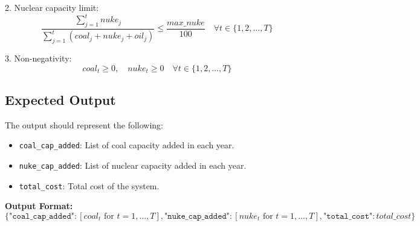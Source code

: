 \documentclass{article}
\begin{document}
2. Nuclear capacity limit:
\[
\frac{\sum_{j=1}^{t} nuke_j}{\sum_{j=1}^{t} (coal_j + nuke_j + oil_j)} \leq \frac{max\_nuke}{100} \quad \forall t \in \{1, 2, \ldots, T\}
\]

3. Non-negativity:
\[
coal_t \geq 0, \quad nuke_t \geq 0 \quad \forall t \in \{1, 2, \ldots, T\}
\]

\subsection*{Expected Output}
The output should represent the following:
\begin{itemize}
    \item \texttt{coal\_cap\_added}: List of coal capacity added in each year.
    \item \texttt{nuke\_cap\_added}: List of nuclear capacity added in each year.
    \item \texttt{total\_cost}: Total cost of the system.
\end{itemize}

\textbf{Output Format:}
\[
\{ 
\texttt{"coal\_cap\_added"}: [coal_t \text{ for } t = 1, \ldots, T], 
\texttt{"nuke\_cap\_added"}: [nuke_t \text{ for } t = 1, \ldots, T], 
\texttt{"total\_cost"}: total\_cost 
\}
\]
\end{document}
